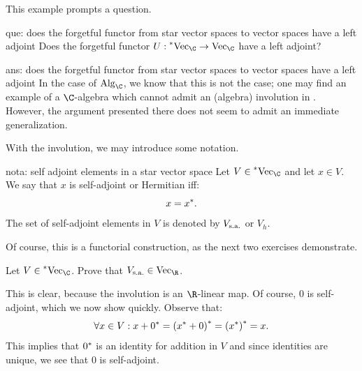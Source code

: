 \documentclass[main.tex]{subfiles}
\begin{document}
This example prompts a question. 

\begin{Question}{}{que: does the forgetful functor from star vector spaces to vector spaces have a left adjoint}
Does the forgetful functor $U: \StarVect \to \Vect{\C}$ have a left adjoint?
\end{Question}
\begin{Answer}{}{ans: does the forgetful functor from star vector spaces to vector spaces have a left adjoint}
In the case of $\Alg_{\C}$, we know that this is not the case; one may find an example of a $\C$-algebra which cannot admit an (algebra) involution in \cite[Example 2.5, p.9]{Schmudgen}. However, the argument presented there does not seem to admit an immediate generalization.  
\end{Answer}

With the involution, we may introduce some notation. 

\begin{notation}{}{nota: self adjoint elements in a star vector space}
Let $V \in \StarVect$ and let $x \in V$. We say that $x$ is self-adjoint or Hermitian iff: 
\[x = {x}^{*}.\]    
The set of self-adjoint elements in $V$ is denoted by $V_{\text{s.a.}}$ or $V_h$. 
\end{notation}

Of course, this is a functorial construction, as the next two exercises demonstrate. 

\begin{exercise}\label{ex: self adjoint part of a star vector space is a real vector space}Let $V \in \StarVect$. Prove that $\selfadjointpart{V} \in \Vect{\R}$. 
\end{exercise}
\begin{solution}\label{sol: self adjoint part of a star vector space is a real vector space}This is clear, because the involution is an $\R$-linear map. Of course, $0$ is self-adjoint, which we now show quickly. Observe that:
\[\forall x \in V: x+{0}^{*} = {({x}^{*}+0)}^{*} = {({x}^{*})}^{*} = x.\]
This implies that ${0}^{*}$ is an identity for addition in $V$ and since identities are unique, we see that $0$ is self-adjoint.    
\end{solution}
\end{document}
